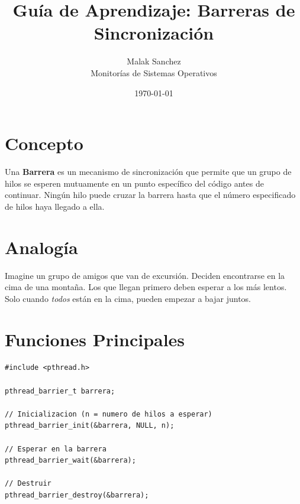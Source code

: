 \documentclass[12pt,a4paper]{article}
\title{\textbf{Guía de Aprendizaje: Barreras de Sincronización}}
\author{Malak Sanchez \\ \small Monitorías de Sistemas Operativos}
\date{\today}
\begin{document}
\maketitle

\section{Concepto}
Una \textbf{Barrera} es un mecanismo de sincronización que permite que un grupo de hilos se esperen mutuamente en un punto específico del código antes de continuar. Ningún hilo puede cruzar la barrera hasta que el número especificado de hilos haya llegado a ella.

\section{Analogía}
Imagine un grupo de amigos que van de excursión. Deciden encontrarse en la cima de una montaña. Los que llegan primero deben esperar a los más lentos. Solo cuando \textit{todos} están en la cima, pueden empezar a bajar juntos.

\begin{center}
\end{center}

\newpage

\section{Funciones Principales}
\begin{lstlisting}[numbers=none]
#include <pthread.h>

pthread_barrier_t barrera;

// Inicializacion (n = numero de hilos a esperar)
pthread_barrier_init(&barrera, NULL, n);

// Esperar en la barrera
pthread_barrier_wait(&barrera);

// Destruir
pthread_barrier_destroy(&barrera);
\end{lstlisting}
\end{document}
